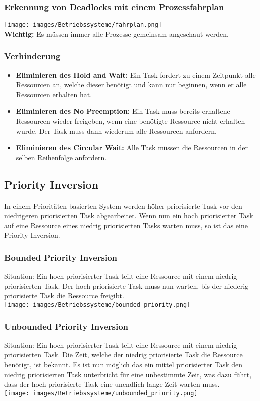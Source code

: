 \subsubsection{Erkennung von Deadlocks mit einem Prozessfahrplan}
\texttt{[image: images/Betriebssysteme/fahrplan.png]} \\
\textbf{Wichtig:} Es müssen immer alle Prozesse gemeinsam angeschaut werden. 


\subsubsection{Verhinderung}
\begin{itemize}
    \item \textbf{Eliminieren des Hold and Wait:} Ein Task fordert zu einem Zeitpunkt alle Ressourcen an, welche dieser benötigt und kann nur beginnen, wenn er alle Ressourcen erhalten hat.
    \item \textbf{Eliminieren des No Preemption:} Ein Task muss bereits erhaltene Ressourcen wieder freigeben, wenn eine benötigte Ressource nicht erhalten wurde. Der Task muss dann wiederum alle Ressourcen anfordern.
    \item \textbf{Eliminieren des Circular Wait:} Alle Task müssen die Ressourcen in der selben Reihenfolge anfordern.
\end{itemize}

\subsection{Priority Inversion}
In einem Prioritäten basierten System werden höher priorisierte Task vor den niedrigeren priorisierten Task abgearbeitet. Wenn nun ein hoch priorisierter Task auf eine Ressource eines niedrig priorisierten Tasks warten muss, so ist das eine Priority Inversion.

\subsubsection{Bounded Priority Inversion}
Situation: Ein hoch priorisierter Task teilt eine Ressource mit einem niedrig priorisierten Task. Der hoch priorisierte Task muss nun warten, bis der niederig priorisierte Task die Ressource freigibt. \\
\texttt{[image: images/Betriebssysteme/bounded\_priority.png]}

\clearpage
\subsubsection{Unbounded Priority Inversion}
Situation: Ein hoch priorisierter Task teilt eine Ressource mit einem niedrig priorisierten Task. Die Zeit, welche der niedrig priorisierte Task die Ressource benötigt, ist bekannt. Es ist nun möglich das ein mittel priorisierter Task den niedrig priorisierten Task unterbricht für eine unbestimmte Zeit, was dazu führt, dass der hoch priorisierte Task eine unendlich lange Zeit warten muss. \\
\texttt{[image: images/Betriebssysteme/unbounded\_priority.png]}

